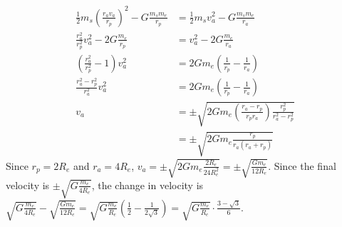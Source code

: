\documentclass{esg8012pset}
\begin{document}
\begin{solution}
\begin{enumerate}[(a)]
\begin{align*}
 \frac{1}{2} m_s \left(\frac{r_a v_a}{r_p}\right)^2 - G\frac{m_s m_e}{r_p} & = \frac{1}{2} m_s v_a^2 - G\frac{m_s m_e}{r_a} \\
 \frac{r_a^2}{r_p^2} v_a^2 - 2G\frac{m_e}{r_p} & = v_a^2 - 2G\frac{m_e}{r_a} \\
 \left(\frac{r_a^2}{r_p^2} - 1\right) v_a^2 & = 2Gm_e\left(\frac{1}{r_p} - \frac{1}{r_a}\right) \\
 \frac{r_a^2 - r_p^2}{r_a^2} v_a^2  & = 2Gm_e\left(\frac{1}{r_p} - \frac{1}{r_a}\right) \\
 v_a  & = \pm\sqrt{2Gm_e\left(\frac{r_a - r_p}{r_p r_a}\right)\frac{r_p^2}{r_a^2 - r_p^2}} \\
   & = \pm\sqrt{2Gm_e\frac{r_p}{r_a(r_a + r_p)}}
\end{align*}  Since $r_p = 2R_e$ and $r_a = 4R_e$, $v_a = \pm\sqrt{2Gm_e\frac{2R_e}{24R_e^2}} = \pm\sqrt{\frac{G m_e}{12R_e}}$.  Since the final velocity is $\pm \sqrt{G\frac{m_e}{4R_e}}$, the change in velocity is $\sqrt{G\frac{m_e}{4R_e}} - \sqrt{\frac{G m_e}{12R_e}} = \sqrt{G\frac{m_e}{R_e}}\left(\frac{1}{2} - \frac{1}{2\sqrt{3}}\right) = \sqrt{G\frac{m_e}{R_e}}\cdot \frac{3 - \sqrt{3}}{6}$.
\end{enumerate}
\end{solution}
\end{document}
